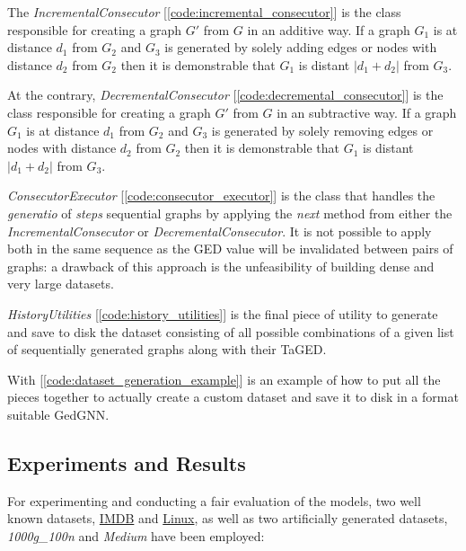 \documentclass[../Thesis.tex]{subfiles}
\begin{document}
	
	The \textit{IncrementalConsecutor} [\autoref{code:incremental_consecutor}] is the class responsible for creating a graph $G'$ from $G$ in an additive way. If a graph $G_1$ is at distance $d_1$ from $G_2$ and $G_3$ is generated by solely adding edges or nodes with distance $d_2$ from $G_2$ then it is demonstrable that $G_1$ is distant $|d_1 + d_2|$ from $G_3$.
	
	
	At the contrary, \textit{DecrementalConsecutor} [\autoref{code:decremental_consecutor}] is the class responsible for creating a graph $G'$ from $G$ in an subtractive way. If a graph $G_1$ is at distance $d_1$ from $G_2$ and $G_3$ is generated by solely removing edges or nodes with distance $d_2$ from $G_2$ then it is demonstrable that $G_1$ is distant $|d_1 + d_2|$ from $G_3$.
	
	
	\textit{ConsecutorExecutor} [\autoref{code:consecutor_executor}] is the class that handles the \emph{generatio} of \emph{steps} sequential graphs by applying the \emph{next} method from either the \textit{IncrementalConsecutor} or \textit{DecrementalConsecutor}. It is not possible to apply both in the same sequence as the GED value will be invalidated between pairs of graphs: a drawback of this approach is the unfeasibility of building dense and very large datasets.
	
	
	\textit{HistoryUtilities} [\autoref{code:history_utilities}] is the final piece of utility to generate and save to disk the dataset consisting of all possible combinations of a given list of sequentially generated graphs along with their TaGED.  
	
	
	With [\autoref{code:dataset_generation_example}] is an example of how to put all the pieces together to actually create a custom dataset and save it to disk in a format suitable GedGNN.
	
	\subsection{Experiments and Results}
	
	For experimenting and conducting a fair evaluation of the models, two well known datasets, \href{https://paperswithcode.com/dataset/imdb-multi}{IMDB} and \href{https://paperswithcode.com/dataset/linux}{Linux}, as well as two artificially generated datasets, \emph{1000g\_100n} and \emph{Medium} have been employed:
	
\end{document}

